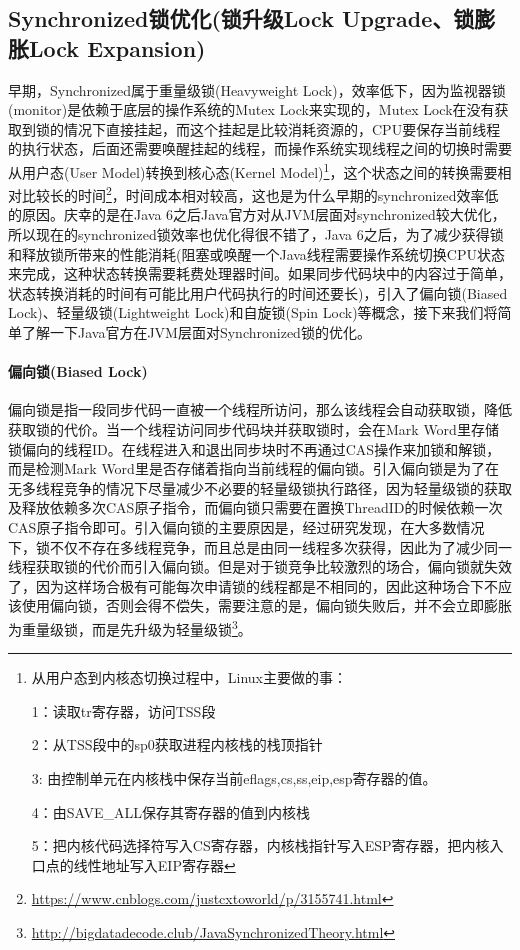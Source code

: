 \documentclass[../../../interview-questions.tex]{subfiles}
\begin{document}
\subsection{Synchronized锁优化(锁升级Lock Upgrade、锁膨胀Lock Expansion)}

早期，Synchronized属于重量级锁(Heavyweight Lock)，效率低下，因为监视器锁(monitor)是依赖于底层的操作系统的Mutex Lock来实现的，Mutex Lock在没有获取到锁的情况下直接挂起，而这个挂起是比较消耗资源的，CPU要保存当前线程的执行状态，后面还需要唤醒挂起的线程，而操作系统实现线程之间的切换时需要从用户态(User Model)转换到核心态(Kernel Model)\footnote{从用户态到内核态切换过程中，Linux主要做的事：

1：读取tr寄存器，访问TSS段

2：从TSS段中的sp0获取进程内核栈的栈顶指针

3:  由控制单元在内核栈中保存当前eflags,cs,ss,eip,esp寄存器的值。

4：由SAVE\_ALL保存其寄存器的值到内核栈

5：把内核代码选择符写入CS寄存器，内核栈指针写入ESP寄存器，把内核入口点的线性地址写入EIP寄存器}，这个状态之间的转换需要相对比较长的时间\footnote{\url{https://www.cnblogs.com/justcxtoworld/p/3155741.html}}，时间成本相对较高，这也是为什么早期的synchronized效率低的原因。庆幸的是在Java 6之后Java官方对从JVM层面对synchronized较大优化，所以现在的synchronized锁效率也优化得很不错了，Java 6之后，为了减少获得锁和释放锁所带来的性能消耗(阻塞或唤醒一个Java线程需要操作系统切换CPU状态来完成，这种状态转换需要耗费处理器时间。如果同步代码块中的内容过于简单，状态转换消耗的时间有可能比用户代码执行的时间还要长)，引入了偏向锁(Biased Lock)、轻量级锁(Lightweight Lock)和自旋锁(Spin Lock)等概念，接下来我们将简单了解一下Java官方在JVM层面对Synchronized锁的优化。

\paragraph{偏向锁(Biased Lock)}偏向锁是指一段同步代码一直被一个线程所访问，那么该线程会自动获取锁，降低获取锁的代价。当一个线程访问同步代码块并获取锁时，会在Mark Word里存储锁偏向的线程ID。在线程进入和退出同步块时不再通过CAS操作来加锁和解锁，而是检测Mark Word里是否存储着指向当前线程的偏向锁。引入偏向锁是为了在无多线程竞争的情况下尽量减少不必要的轻量级锁执行路径，因为轻量级锁的获取及释放依赖多次CAS原子指令，而偏向锁只需要在置换ThreadID的时候依赖一次CAS原子指令即可。引入偏向锁的主要原因是，经过研究发现，在大多数情况下，锁不仅不存在多线程竞争，而且总是由同一线程多次获得，因此为了减少同一线程获取锁的代价而引入偏向锁。但是对于锁竞争比较激烈的场合，偏向锁就失效了，因为这样场合极有可能每次申请锁的线程都是不相同的，因此这种场合下不应该使用偏向锁，否则会得不偿失，需要注意的是，偏向锁失败后，并不会立即膨胀为重量级锁，而是先升级为轻量级锁\footnote{\url{http://bigdatadecode.club/JavaSynchronizedTheory.html}}。
\end{document}
